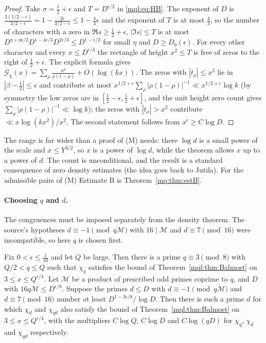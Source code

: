 \begin{proof}
Take $\sigma=\frac12+\epsilon$ and $T=D^{\epsilon/2}$ in \eqref{mql:eq:HB}. The exponent of $D$ is $\frac{3(1/2-\epsilon)}{3/2-\epsilon}=1-\frac{2\epsilon}{3/2-\epsilon}\le1-\frac43\epsilon$ and the exponent of $T$ is at most $\frac43$, so the number of characters with a zero in $\Re s\ge\frac12+\epsilon$, $|\Im s|\le T$ is at most $D^{\eta+\eta\epsilon/2}D^{1-4\epsilon/3}D^{2\epsilon/3}\le D^{1-\epsilon/2}$ for small $\eta$ and $D\ge D_0(\epsilon)$. For every other character and every $x\le D^{\epsilon/4}$ the rectangle of height $x^2\le T$ is free of zeros to the right of $\frac12+\epsilon$. The explicit formula gives $\mathcal G_\chi(x)=\sum_\rho\frac{x^\rho}{\rho(1-\rho)}+O(\log(kx))$. The zeros with $|t_\rho|\le x^2$ lie in $|\beta-\frac12|\le\epsilon$ and contribute at most $x^{1/2+\epsilon}\sum_\rho|\rho(1-\rho)|^{-1}\ll x^{1/2+\epsilon}\log k$ (by symmetry the low zeros are in $[\frac12-\epsilon,\frac12+\epsilon]$, and the unit height zero count gives $\sum_\rho|\rho(1-\rho)|^{-1}\ll\log k$); the zeros with $|t_\rho|>x^2$ contribute $\ll x\log(kx^2)/x^2$. The second statement follows from $x^\epsilon\ge C\log D$.
\end{proof}

The range is far wider than a proof of (M) needs: there $\log d$ is a small power of the scale and $x\le Y^{3/2}$, so $x$ is a power of $\log d$, while the theorem allows $x$ up to a power of $d$. The count is unconditional, and the result is a standard consequence of zero density estimates (the idea goes back to Jutila). For the admissible pairs of (M) Estimate B is Theorem~\ref{mq:thm:estB}.

\paragraph{Choosing $q$ and $d$.} The congruences must be imposed separately from the density theorem. The source's hypotheses $d\equiv-1\pmod{q\mathcal M}$ with $16\mid\mathcal M$ and $d\equiv7\pmod{16}$ were incompatible, so here $q$ is chosen first.

\begin{proposition}[Selection of $(q,d)$]\label{mql:prop:choose}
Fix $0<\epsilon\le\frac1{10}$ and let $Q$ be large. Then there is a prime $q\equiv3\pmod8$ with $Q/2<q\le Q$ such that $\chi_{q}$ satisfies the bound of Theorem~\ref{mql:thm:Balmost} on $3\le x\le Q^{\epsilon/4}$. Let $\mathcal M$ be a product of prescribed odd primes coprime to $q$, and $D$ with $16q\mathcal M\le D^{\epsilon/8}$. Suppose the primes $d\le D$ with $d\equiv-1\pmod{q\mathcal M}$ and $d\equiv7\pmod{16}$ number at least $D^{1-3\epsilon/8}/\log D$. Then there is such a prime $d$ for which $\chi_d$ and $\chi_{qd}$ also satisfy the bound of Theorem~\ref{mql:thm:Balmost} on $3\le x\le Q^{\epsilon/4}$, with the multipliers $C\log Q$, $C\log D$ and $C\log(qD)$ for $\chi_q$, $\chi_d$ and $\chi_{qd}$ respectively.
\end{proposition}

